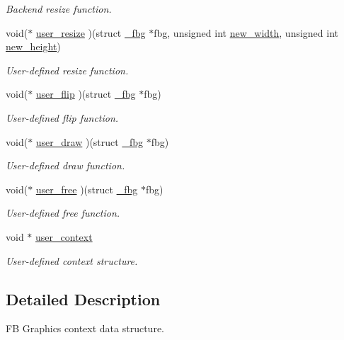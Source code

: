 \begin{DoxyCompactItemize}
\begin{DoxyCompactList}\small\item\em Backend resize function. \end{DoxyCompactList}\item 
void($\ast$ \hyperlink{struct__fbg_a68add70dac4b055809c1bcab1e65b18d}{user\+\_\+resize} )(struct \hyperlink{struct__fbg}{\+\_\+fbg} $\ast$fbg, unsigned int \hyperlink{struct__fbg_a95859bd418a5cfff155cdb1421d295ef}{new\+\_\+width}, unsigned int \hyperlink{struct__fbg_a509aa5f8f0a94d8313bb4da777aa64bc}{new\+\_\+height})
\begin{DoxyCompactList}\small\item\em User-\/defined resize function. \end{DoxyCompactList}\item 
void($\ast$ \hyperlink{struct__fbg_a3f2ad2eb06555cdbe2d18f541231cb37}{user\+\_\+flip} )(struct \hyperlink{struct__fbg}{\+\_\+fbg} $\ast$fbg)
\begin{DoxyCompactList}\small\item\em User-\/defined flip function. \end{DoxyCompactList}\item 
void($\ast$ \hyperlink{struct__fbg_ac66a762877982c6f381a7cfd54a8f17e}{user\+\_\+draw} )(struct \hyperlink{struct__fbg}{\+\_\+fbg} $\ast$fbg)
\begin{DoxyCompactList}\small\item\em User-\/defined draw function. \end{DoxyCompactList}\item 
void($\ast$ \hyperlink{struct__fbg_a88d48b502672cfb8bd2c94ea3feac8d0}{user\+\_\+free} )(struct \hyperlink{struct__fbg}{\+\_\+fbg} $\ast$fbg)
\begin{DoxyCompactList}\small\item\em User-\/defined free function. \end{DoxyCompactList}\item 
void $\ast$ \hyperlink{struct__fbg_ae3ecac18abee9dedabacaca9bb063bde}{user\+\_\+context}
\begin{DoxyCompactList}\small\item\em User-\/defined context structure. \end{DoxyCompactList}\end{DoxyCompactItemize}


\subsection{Detailed Description}
FB Graphics context data structure. 

